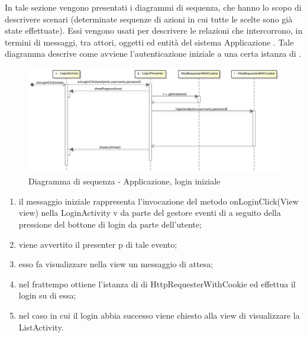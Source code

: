         In tale sezione vengono presentati i diagrammi di sequenza, che hanno lo scopo di descrivere scenari (determinate sequenze di azioni in cui tutte le scelte sono già state effettuate). Essi vengono usati per descrivere le relazioni che intercorrono, in termini di messaggi, tra attori, oggetti ed entità del sistema Applicazione .
            Tale diagramma descrive come avviene l'autenticazione iniziale a una certa istanza di .
            \begin{figure}[H]
                \centering
                \includegraphics[scale=0.3]{DefinizioneDiProdotto/Pics/ApplicazioneLogin}
                \caption{Diagramma di sequenza - Applicazione, login iniziale}
            \end{figure}
            \begin{enumerate}
                \item il messaggio iniziale rappresenta l'invocazione del metodo onLoginClick(View view) nella LoginActivity v da parte del gestore eventi di  a seguito della pressione del bottone di login da parte dell'utente;
                \item viene avvertito il presenter p di tale evento;
                \item esso fa visualizzare nella view un messaggio di attesa;
                \item nel frattempo ottiene l'istanza di di HttpRequesterWithCookie ed effettua il login su di essa;
                \item nel caso in cui il login abbia successo viene chiesto alla view di visualizzare la ListActivity.
            \end{enumerate}

